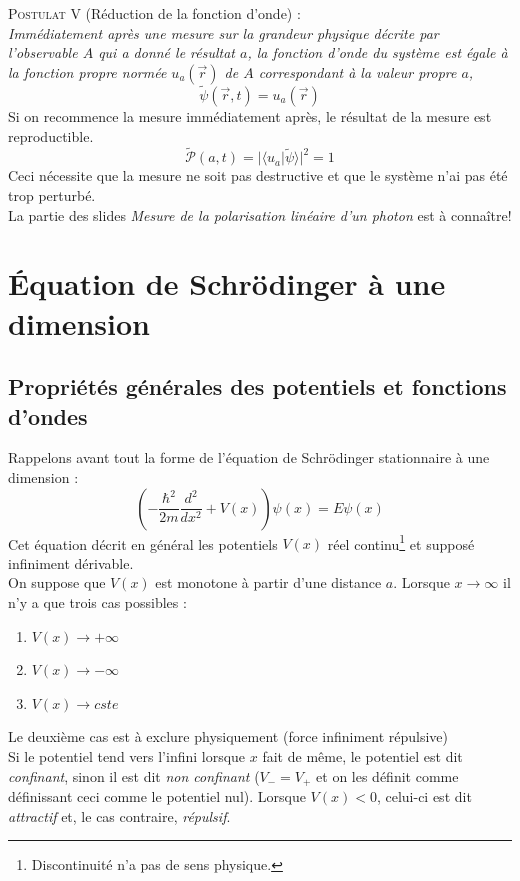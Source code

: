 \documentclass	[11pt, a4paper, openany]{book}
\begin{document}
	\textsc{Postulat V} (Réduction de la fonction d'onde) :\\
	\textit{Immédiatement après une mesure sur la grandeur physique décrite par l'observable $A$ qui a donné le résultat $a$, la fonction d'onde du système est égale à la fonction propre normée $u_a(\vec{r})$ de $A$ correspondant à la valeur propre $a$,}
	\begin{equation}
		\tilde{\psi}(\vec{r},t) = u_a(\vec{r})
	\end{equation}
	Si on recommence la mesure immédiatement après, le résultat de la mesure est reproductible.
	\begin{equation}
		\tilde{\mathcal{P}}(a,t) = |\langle u_a|\tilde{\psi}\rangle |^2 = 1
	\end{equation}
	Ceci nécessite que la mesure ne soit pas destructive et que le système n'ai pas été trop perturbé.\\
	
	La partie des slides \textit{Mesure de la polarisation linéaire d'un photon} est à connaître! 
	
	
	
	
	\chapter{Équation de Schrödinger à une dimension}
	\section{Propriétés générales des potentiels et fonctions d'ondes}
	\label{chap:5.1}
	Rappelons avant tout la forme de l'équation de Schrödinger stationnaire à une dimension : 
	\begin{equation}\label{eq:5.1}
		\left(-\frac{\hbar^2}{2m}\frac{d^2}{dx^2} + V(x)\right)\psi(x) = E\psi(x)
	\end{equation}
	Cet équation décrit en général les potentiels $V(x)$ réel continu\footnote{Discontinuité n'a pas de sens physique.} et supposé infiniment dérivable.\\
	
	On suppose que $V(x)$ est monotone à partir d'une distance $a$. Lorsque $x \rightarrow \infty$ il n'y a que trois cas possibles :
	\begin{enumerate}
		\item $V(x) \rightarrow +\infty$
		\item $V(x) \rightarrow -\infty$
		\item $V(x) \rightarrow cste$
	\end{enumerate}
	Le deuxième cas est à exclure physiquement (force infiniment répulsive)\\
	Si le potentiel tend vers l'infini lorsque $x$ fait de même, le potentiel est dit \textit{confinant}, sinon il est dit \textit{non confinant} ($V_- =V_+$ et on les définit comme définissant ceci comme le potentiel nul). Lorsque $V(x) < 0$, celui-ci est dit \textit{attractif} et, le cas contraire, \textit{répulsif}.\\
	
\end{document}
